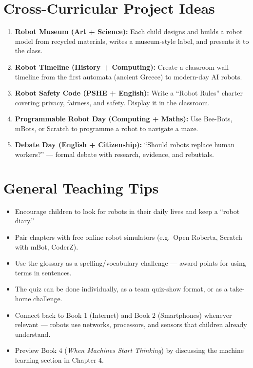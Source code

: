 \sectionrule

\section*{Cross-Curricular Project Ideas}

\begin{enumerate}
  \item \textbf{Robot Museum (Art + Science):} Each child designs and builds a robot
    model from recycled materials, writes a museum-style label, and presents it to the class.
  \item \textbf{Robot Timeline (History + Computing):} Create a classroom wall timeline
    from the first automata (ancient Greece) to modern-day AI robots.
  \item \textbf{Robot Safety Code (PSHE + English):} Write a ``Robot Rules'' charter
    covering privacy, fairness, and safety. Display it in the classroom.
  \item \textbf{Programmable Robot Day (Computing + Maths):} Use Bee-Bots, mBots,
    or Scratch to programme a robot to navigate a maze.
  \item \textbf{Debate Day (English + Citizenship):} ``Should robots replace human
    workers?'' --- formal debate with research, evidence, and rebuttals.
\end{enumerate}

\sectionrule

\section*{General Teaching Tips}

\begin{itemize}
  \item Encourage children to look for robots in their daily lives and keep a ``robot diary.''
  \item Pair chapters with free online robot simulators (e.g.\ Open Roberta, Scratch with mBot, CoderZ).
  \item Use the glossary as a spelling/vocabulary challenge --- award points for using terms in sentences.
  \item The quiz can be done individually, as a team quiz-show format, or as a take-home challenge.
  \item Connect back to Book 1 (Internet) and Book 2 (Smartphones) whenever relevant ---
    robots use networks, processors, and sensors that children already understand.
  \item Preview Book 4 (\emph{When Machines Start Thinking}) by discussing the machine learning
    section in Chapter 4.
\end{itemize}

